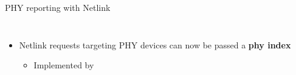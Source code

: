 \begin{frame}{PHY reporting with Netlink}
\begin{columns}
\begin{itemize}
\begin{itemize}
				\item When an SFP module is driven by a PHY, and contains a PHY itself
				\item When a PHY is used as a \textbf{media converter}
			\end{itemize}
		\item Netlink requests targeting PHY devices can now be passed a \textbf{phy index}
			\begin{itemize}
				\item Implemented by 
			\end{itemize}
	\end{itemize}
	\end{columns}
\end{frame}


